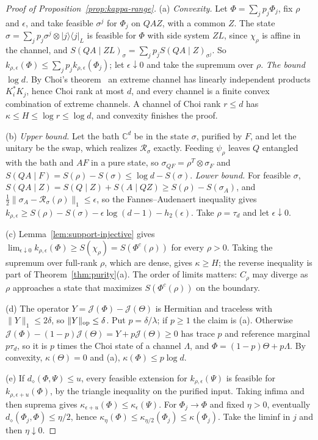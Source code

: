 \documentclass[11pt,a4paper]{article}
\theoremstyle{plain}
\theoremstyle{definition}
\theoremstyle{remark}
\newcommand{\ddia}{d_\diamond}
\begin{document}
\begin{proof}[Proof of Proposition~\ref{prop:kappa-range}]
(a) \emph{Convexity.} Let $\Phi=\sum_jp_j\Phi_j$, fix $\rho$ and $\epsilon$, and take feasible $\sigma^j$ for $\Phi_j$ on $QAZ$, with a common $Z$. The state
$\sigma=\sum_jp_j\sigma^j\otimes|j\rangle\langle j|_L$ is feasible for $\Phi$ with side system $ZL$, since $\chi_\rho$ is affine in the channel, and
$S(QA\mid ZL)_\sigma=\sum_jp_jS(QA\mid Z)_{\sigma^j}$. So $k_{\rho,\epsilon}(\Phi)\le\sum_jp_jk_{\rho,\epsilon}(\Phi_j)$; let $\epsilon\downarrow0$ and take the supremum over
$\rho$. \emph{The bound $\log d$.} By Choi's theorem~\cite{Choi1975} an extreme channel has linearly independent products $K_i^*K_j$, hence Choi rank at
most $d$, and every channel is a finite convex combination of extreme channels. A channel of Choi rank $r\le d$ has $\kappa\le H\le\log r\le\log d$, and
convexity finishes the proof.

(b) \emph{Upper bound.} Let the bath $\mathbb C^d$ be in the state $\sigma$, purified by $F$, and let the unitary be the swap, which realizes $\mathcal R_\sigma$
exactly. Feeding $\psi_\rho$ leaves $Q$ entangled with the bath and $AF$ in a pure state, so $\sigma_{QF}=\rho^T\otimes\sigma_F$ and
$S(QA\mid F)=S(\rho)-S(\sigma)\le\log d-S(\sigma)$. \emph{Lower bound.} For feasible $\sigma$, $S(QA\mid Z)=S(Q\mid Z)+S(A\mid QZ)\ge S(\rho)-S(\sigma_A)$, and
$\frac12\|\sigma_A-\mathcal R_\sigma(\rho)\|_1\le\epsilon$, so the Fannes--Audenaert inequality gives $k_{\rho,\epsilon}\ge S(\rho)-S(\sigma)-\epsilon\log(d-1)-h_2(\epsilon)$.
Take $\rho=\tau_d$ and let $\epsilon\downarrow0$.

(c) Lemma~\ref{lem:support-injective} gives $\lim_{\epsilon\downarrow0}k_{\rho,\epsilon}(\Phi)\ge S(\chi_\rho)=S(\Phi^c(\rho))$ for every $\rho>0$. Taking the supremum over full-rank
$\rho$, which are dense, gives $\kappa\ge H$; the reverse inequality is part of Theorem~\ref{thm:purity}(a). The order of limits matters: $C_\rho$ may
diverge as $\rho$ approaches a state that maximizes $S(\Phi^c(\rho))$ on the boundary.

(d) The operator $Y=\mathcal J(\Phi)-\mathcal J(\Theta)$ is Hermitian and traceless with $\|Y\|_1\le2\delta$, so $\|Y\|_{\rm op}\le\delta$. Put $p=\delta/\lambda$; if
$p\ge1$ the claim is (a). Otherwise $\mathcal J(\Phi)-(1-p)\mathcal J(\Theta)=Y+p\mathcal J(\Theta)\ge0$ has trace $p$ and reference marginal $p\tau_d$, so it is $p$
times the Choi state of a channel $\Lambda$, and $\Phi=(1-p)\Theta+p\Lambda$. By convexity, $\kappa(\Theta)=0$ and (a),
$\kappa(\Phi)\le p\log d$.

(e) If $\ddia(\Phi,\Psi)\le u$, every feasible extension for $k_{\rho,\epsilon}(\Psi)$ is feasible for $k_{\rho,\epsilon+u}(\Phi)$, by the triangle
inequality on the purified input. Taking infima and then suprema gives $\kappa_{\epsilon+u}(\Phi)\le\kappa_\epsilon(\Psi)$.
For $\Phi_j\to\Phi$ and fixed $\eta>0$, eventually $\ddia(\Phi_j,\Phi)\le\eta/2$, hence
$\kappa_\eta(\Phi)\le\kappa_{\eta/2}(\Phi_j)\le\kappa(\Phi_j)$. Take the liminf in $j$ and then $\eta\downarrow0$.
\end{proof}
\end{document}
